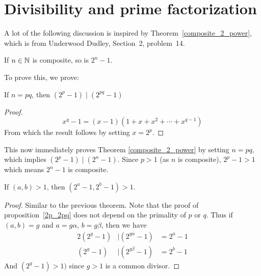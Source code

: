 \documentclass{article}
\begin{document}
{}

\section{Divisibility and prime factorization}
A lot of the following discussion is inspired by
Theorem~\ref{composite_2_power}, which is from Underwood Dudley,
Section~2, problem~14.

\begin{thm}\label{composite_2_power}
  If $n\in \mathbb{N}$ is composite, so is $2^n - 1$.
\end{thm}
To prove this, we prove:
\begin{prop}\label{2p_2pq}
  If $n = pq$, then $(2^p - 1)\mid (2^{pq}-1)$
\end{prop}
\begin{proof}
  \[x^q - 1 = (x - 1)(1 + x + x^2 +\cdots+ x^{q-1})\]
  From which the result follows by setting $x = 2^p$.
\end{proof}

This now immediately proves Theorem \ref{composite_2_power} by setting
$n = pq$, which implies $(2^p - 1) \mid (2^n - 1)$. Since $p > 1$ (as $n$
is composite), $2^p - 1 > 1$ which means $2^n - 1$ is composite.

\begin{cor}\label{2a_2b_gcd_match}
  If $(a,b) > 1$, then $(2^a - 1, 2^b - 1) > 1$.
\end{cor}
\begin{proof}
  Similar to the previous theorem. Note that the proof of
  proposition~\ref{2p_2pq} does not depend on the primality of $p$ or
  $q$. Thus if $(a,b) = g$ and $a = g\alpha$, $b = g\beta$, then we have
  \begin{alignat*}{2}
    (2^g - 1) & \mid (2^{g\alpha} - 1) &= 2^a - 1\\
    (2^g - 1) & \mid (2^{g\beta}  - 1) &= 2^b - 1
  \end{alignat*}
  And $(2^g - 1) > 1)$ since $g > 1$ is a common divisor.
\end{proof}
\end{document}
